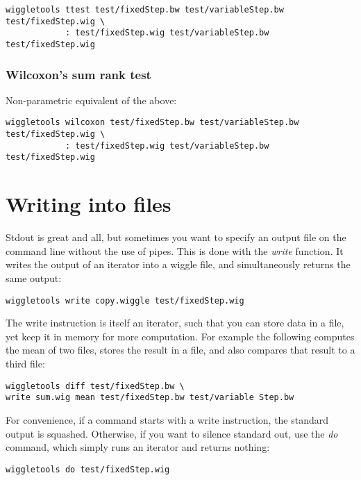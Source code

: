 \documentclass[12pt]{article}
\begin{document}
\begin{verbatim}
wiggletools ttest test/fixedStep.bw test/variableStep.bw test/fixedStep.wig \
            : test/fixedStep.wig test/variableStep.bw test/fixedStep.wig
\end{verbatim}

\subsubsection{Wilcoxon's sum rank test}

Non-parametric equivalent of the above:

\begin{verbatim}
wiggletools wilcoxon test/fixedStep.bw test/variableStep.bw test/fixedStep.wig \
            : test/fixedStep.wig test/variableStep.bw test/fixedStep.wig
\end{verbatim}

\section{Writing into files}

Stdout is great and all, but sometimes you want to specify an output file on the command line without the use of pipes. This is done with the \emph{write} function. It writes the output of an iterator into a wiggle file, and simultaneously returns the same output:

\begin{verbatim}
wiggletools write copy.wiggle test/fixedStep.wig 
\end{verbatim}

The write instruction is itself an iterator, such that you can store data in a file, yet keep it in memory for more computation. For example the following computes the mean of two files, stores the result in a file, and also compares that result to a third file:

\begin{verbatim}
wiggletools diff test/fixedStep.bw \
write sum.wig mean test/fixedStep.bw test/variable Step.bw 
\end{verbatim}

For convenience, if a command starts with a write instruction, the standard output is squashed. Otherwise, if you want to silence standard out, use the \emph{do} command, which simply runs an iterator and returns nothing: 

\begin{verbatim}
wiggletools do test/fixedStep.wig 
\end{verbatim}
\end{document}
